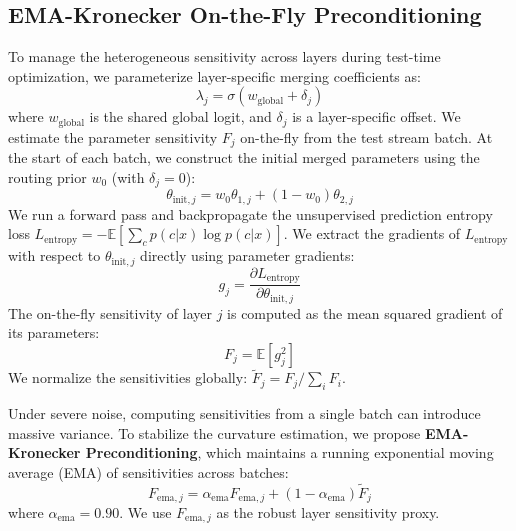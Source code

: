\documentclass{article}
\theoremstyle{plain}
\theoremstyle{definition}
\theoremstyle{remark}
\begin{document}
\subsection{EMA-Kronecker On-the-Fly Preconditioning}
To manage the heterogeneous sensitivity across layers during test-time optimization, we parameterize layer-specific merging coefficients as:
\begin{equation}
\lambda_j = \sigma(w_{\text{global}} + \delta_j)
\end{equation}
where $w_{\text{global}}$ is the shared global logit, and $\delta_j$ is a layer-specific offset. We estimate the parameter sensitivity $F_j$ on-the-fly from the test stream batch. At the start of each batch, we construct the initial merged parameters using the routing prior $w_0$ (with $\delta_j = 0$):
\begin{equation}
\theta_{\text{init}, j} = w_0 \theta_{1, j} + (1 - w_0) \theta_{2, j}
\end{equation}
We run a forward pass and backpropagate the unsupervised prediction entropy loss $L_{\text{entropy}} = -\mathbb{E} \left[ \sum_c p(c|x) \log p(c|x) \right]$. We extract the gradients of $L_{\text{entropy}}$ with respect to $\theta_{\text{init}, j}$ directly using parameter gradients:
\begin{equation}
g_j = \frac{\partial L_{\text{entropy}}}{\partial \theta_{\text{init}, j}}
\end{equation}
The on-the-fly sensitivity of layer $j$ is computed as the mean squared gradient of its parameters:
\begin{equation}
F_j = \mathbb{E}[g_j^2]
\end{equation}
We normalize the sensitivities globally: $\tilde{F}_j = F_j / \sum_i F_i$. 

Under severe noise, computing sensitivities from a single batch can introduce massive variance. To stabilize the curvature estimation, we propose \textbf{EMA-Kronecker Preconditioning}, which maintains a running exponential moving average (EMA) of sensitivities across batches:
\begin{equation}
F_{\text{ema}, j} = \alpha_{\text{ema}} F_{\text{ema}, j} + (1 - \alpha_{\text{ema}}) \tilde{F}_j
\end{equation}
where $\alpha_{\text{ema}} = 0.90$. We use $F_{\text{ema}, j}$ as the robust layer sensitivity proxy.
\end{document}
